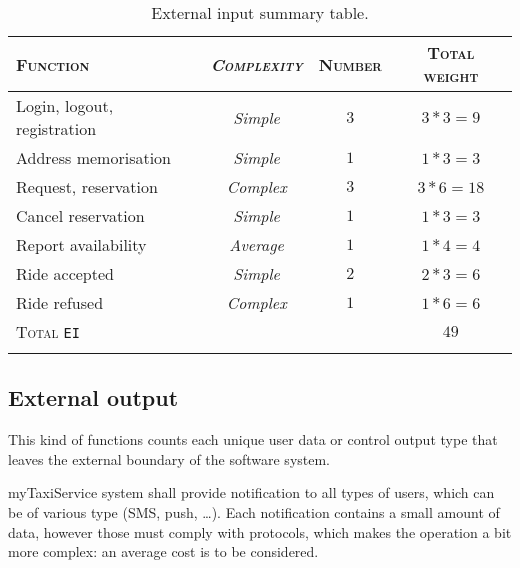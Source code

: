 \begin{table*}\begin{tabularx}{\textwidth}{ X >{\itshape}C{\myWFP} C{\myWFP} C{\myWFP} }

\toprule
	
	\normalfont\textsc{Function} &
	\normalfont\textsc{Complexity}	& 
	\normalfont\textsc{Number} &
	\normalfont\textsc{Total weight} \\

\toprule

	Login, logout, registration	& Simple		& $ 3 $		& $ 3*3 = 9 $ \\
\midrule
	Address memorisation			& Simple		& $ 1 $		& $ 1*3 = 3 $ \\
\midrule
	Request, reservation			& Complex	& $ 3 $		& $ 3*6 = 18 $ \\
\midrule
	Cancel reservation			& Simple		& $ 1 $ 		& $ 1*3 = 3 $ \\
\midrule
	Report availability			& Average	& $ 1 $ 		& $ 1*4 = 4 $ \\
\midrule
	Ride accepted				& Simple		& $ 2 $ 		& $ 2*3 = 6 $ \\
\midrule
	Ride refused				& Complex	& $ 1 $ 		& $ 1*6 = 6 $ \\

\bottomrule

\normalfont\textsc{Total} \texttt{EI} && & $ 49 $ \\

\bottomrule

\caption{External input summary table.}

\label{tab:ei}\end{tabularx}\end{table*}










\subsection*{External output}

This kind of functions counts each unique user data or control output type that leaves the external boundary of the software system.

myTaxiService system shall provide notification to all types of users, which can be of various type (SMS, push, \dots). Each notification contains a small amount of data, however those must comply with protocols, which makes the operation a bit more complex: an average cost is to be considered.



